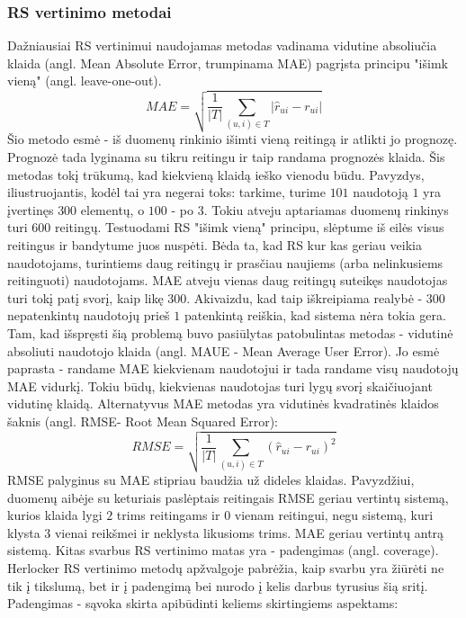 \documentclass{VUMIFInfMagistrinis}
\begin{document}
\subsubsection{RS vertinimo metodai}
Dažniausiai RS vertinimui naudojamas metodas vadinama vidutine absoliučia klaida (angl. Mean Absolute Error, trumpinama MAE) pagrįsta principu "išimk vieną" (angl. leave-one-out). 
\begin{equation}
	MAE = \sqrt{\frac{1}{|T|}\sum\limits_{(u,i)\in T} |\hat{r}_{ui} - r_{ui}|}
\end{equation}
Šio metodo esmė - iš duomenų rinkinio išimti vieną reitingą ir atlikti jo prognozę. Prognozė tada lyginama su tikru reitingu ir taip randama prognozės klaida. Šis metodas tokį trūkumą, kad kiekvieną klaidą ieško vienodu būdu. Pavyzdys, iliustruojantis, kodėl tai yra negerai toks: tarkime, turime $101$ naudotoją $1$ yra įvertinęs $300$ elementų, o $100$ - po $3$. Tokiu atveju aptariamas duomenų rinkinys turi $600$ reitingų. Testuodami RS "išimk vieną" principu, slėptume iš eilės visus reitingus ir bandytume juos nuspėti. Bėda ta, kad RS kur kas geriau veikia naudotojams, turintiems daug reitingų ir prasčiau naujiems (arba nelinkusiems reitinguoti) naudotojams. MAE atveju vienas daug reitingų suteikęs naudotojas turi tokį patį svorį, kaip likę $300$. Akivaizdu, kad taip iškreipiama realybė - $300$ nepatenkintų naudotojų prieš $1$ patenkintą reiškia, kad sistema nėra tokia gera. Tam, kad išspręsti šią problemą buvo pasiūlytas patobulintas metodas - vidutinė absoliuti naudotojo klaida (angl. MAUE - Mean Average User Error). Jo esmė paprasta - randame MAE kiekvienam naudotojui ir tada randame visų naudotojų MAE vidurkį. Tokiu būdų, kiekvienas naudotojas turi lygų svorį skaičiuojant vidutinę klaidą.
\newline
\indent
Alternatyvus MAE metodas yra vidutinės kvadratinės klaidos šaknis (angl. RMSE- Root Mean Squared Error):
\begin{equation}
	RMSE = \sqrt{\frac{1}{|T|}\sum\limits_{(u,i)\in T} (\hat{r}_{ui} - r_{ui})^2}
\end{equation}
RMSE palyginus su MAE stipriau baudžia už dideles klaidas. Pavyzdžiui, duomenų aibėje su keturiais paslėptais reitingais RMSE geriau vertintų sistemą, kurios klaida lygi $2$ trims reitingams ir $0$ vienam reitingui, negu sistemą, kuri klysta $3$ vienai reikšmei ir neklysta likusioms trims. MAE geriau vertintų antrą sistemą.
\newline
\indent
Kitas svarbus RS vertinimo matas yra - padengimas (angl. coverage). Herlocker RS vertinimo metodų apžvalgoje pabrėžia, kaip svarbu yra žiūrėti ne tik į tikslumą, bet ir į padengimą bei nurodo į kelis darbus tyrusius šią sritį. Padengimas - sąvoka skirta apibūdinti keliems skirtingiems aspektams:
\end{document}
